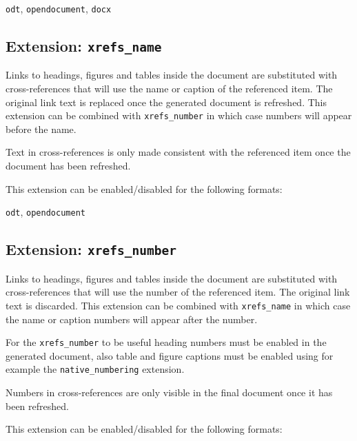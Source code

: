 \documentclass[
  b5paper
]{book}
\providecommand{\tightlist}{%
  \setlength{\itemsep}{0pt}\setlength{\parskip}{0pt}}
\begin{document}
\begin{description}
\tightlist
\item[output formats]
\texttt{odt}, \texttt{opendocument}, \texttt{docx}
\end{description}

\subsection{\texorpdfstring{Extension:
\texttt{xrefs\_name}}{Extension: xrefs\_name}}\label{extension-xrefs_name}

Links to headings, figures and tables inside the document are
substituted with cross-references that will use the name or caption of
the referenced item. The original link text is replaced once the
generated document is refreshed. This extension can be combined with
\texttt{xrefs\_number} in which case numbers will appear before the
name.

Text in cross-references is only made consistent with the referenced
item once the document has been refreshed.

This extension can be enabled/disabled for the following formats:

\begin{description}
\tightlist
\item[output formats]
\texttt{odt}, \texttt{opendocument}
\end{description}

\subsection{\texorpdfstring{Extension:
\texttt{xrefs\_number}}{Extension: xrefs\_number}}\label{extension-xrefs_number}

Links to headings, figures and tables inside the document are
substituted with cross-references that will use the number of the
referenced item. The original link text is discarded. This extension can
be combined with \texttt{xrefs\_name} in which case the name or caption
numbers will appear after the number.

For the \texttt{xrefs\_number} to be useful heading numbers must be
enabled in the generated document, also table and figure captions must
be enabled using for example the \texttt{native\_numbering} extension.

Numbers in cross-references are only visible in the final document once
it has been refreshed.

This extension can be enabled/disabled for the following formats:
\end{document}
